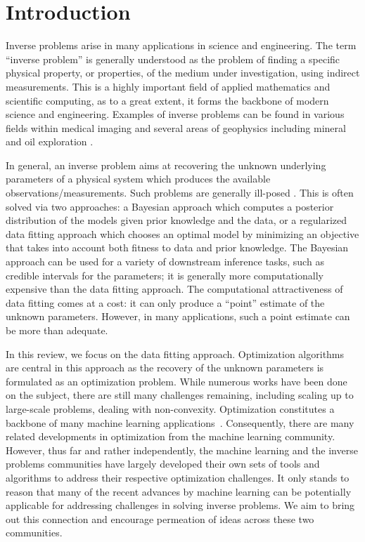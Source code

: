 \section{Introduction}
\label{sec:introduction}

Inverse problems arise in many applications in science and engineering. The term ``inverse problem'' is generally understood as the problem of finding a specific physical property, or properties, of the medium under investigation, using indirect measurements. This is a highly important field of applied mathematics and scientific computing, as to a great extent, it forms the backbone of modern science and engineering. Examples of inverse problems can be found in various fields within medical imaging \cite{arridge1999optical,arridge1997optical,bertero2010introduction,rundell1997inverse,louis1992medical} and several areas of geophysics including mineral and oil exploration \cite{menke2012geophysical,aster2013parameter,bunks1995multiscale,russell1988introduction}. 

In general, an inverse problem aims at recovering the unknown underlying parameters
of a physical system which produces the available observations/measurements.
Such problems are generally ill-posed \cite{hadamard1902sur}.
This is often solved via two approaches: 
a Bayesian approach which computes a posterior distribution
of the models given prior knowledge and the data, or a regularized data
fitting approach which chooses an optimal model by minimizing an objective that
takes into account both fitness to data and prior knowledge.
The Bayesian approach can be used for a variety of downstream inference tasks, such as credible intervals for the
parameters; it is generally more computationally expensive than the data fitting approach. The computational attractiveness of data fitting comes at a cost: it can only produce a ``point'' estimate of the unknown parameters. However, in many applications, such a point estimate can be more than adequate.  

In this review, we focus on the data fitting approach.
Optimization algorithms are central in this approach as the recovery of the unknown parameters is formulated as an optimization problem.
While numerous works have been done on the subject, there are still many
challenges remaining, including scaling up to large-scale problems, dealing with
non-convexity.
Optimization constitutes a backbone of many machine learning applications~\cite{bottou2016optimization,domingos2012few}. Consequently, there are many related developments in optimization from the
machine learning community. However, thus far and rather independently, the machine learning and the inverse problems communities have largely developed their own sets of tools and algorithms to address their respective optimization challenges.
It only stands to reason that many of the recent advances by machine learning can be potentially applicable for addressing challenges in solving inverse problems.
We aim to bring out this connection and encourage permeation of ideas across these two communities.

